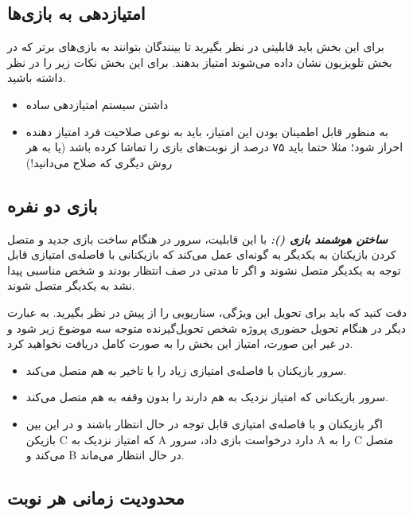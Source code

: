 \documentclass[]{article}
\begin{document}
\subsection*{{\titr امتیازدهی به بازی‌ها}}

برای این بخش باید قابلیتی در نظر بگیرید تا بینندگان بتوانند به بازی‌های برتر که در بخش تلویزیون نشان داده می‌شوند امتیاز بدهند. برای این بخش نکات زیر را در نظر داشته باشید.
\begin{itemize}
	\item داشتن سیستم امتیازدهی ساده
	\item به منظور قابل اطمینان بودن این امتیاز، باید به نوعی صلاحیت فرد امتیاز دهنده احراز شود؛ مثلا حتما باید ۷۵ درصد از نوبت‌های بازی را تماشا کرده باشد (یا به هر روش دیگری که صلاح می‌دانید!)
\end{itemize}

\subsection*{{\titr بازی دو نفره}}

\textbf{\emph{ساختن هوشمند بازی ():}}
با این قابلیت، سرور در هنگام ساخت بازی جدید و متصل کردن بازیکنان به یکدیگر به گونه‌ای عمل می‌کند که بازیکنانی با فاصله‌ی امتیازی قابل توجه به یکدیگر متصل نشوند و اگر تا مدتی در صف انتظار بودند و شخص مناسبی پیدا نشد به یکدیگر متصل شوند.

دقت کنید که باید برای تحویل این ویژگی، سناریویی را از پیش در نظر بگیرید. به عبارت دیگر در هنگام تحویل حضوری پروژه شخص تحویل‌گیرنده متوجه سه موضوع زیر شود و در غیر این صورت، امتیاز این بخش را به صورت کامل دریافت نخواهید کرد.

\begin{itemize}
	\item سرور بازیکنان با فاصله‌ی امتیازی زیاد را با تاخیر به هم متصل می‌کند.
	\item سرور بازیکنانی که امتیاز نزدیک به هم دارند را بدون وقفه به هم متصل می‌کند.
	\item اگر بازیکنان  و  با فاصله‌ی امتیازی قابل توجه در حال انتظار باشند و در این بین بازیکن C که امتیاز نزدیک به A دارد درخواست بازی داد، سرور A را به C متصل می‌کند و B در حال انتظار می‌ماند.
\end{itemize}

\subsection*{{\titr محدودیت زمانی هر نوبت}}
\end{document}
